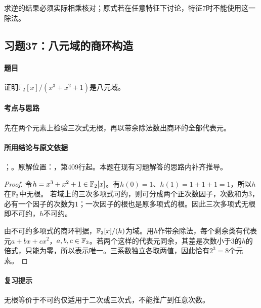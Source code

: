 求逆的结果必须实际相乘核对；原式若在任意特征下讨论，特征$7$时不能使用这一除法。



\subsection{习题37：八元域的商环构造}

\label{ex:3:37}

\paragraph{题目}

证明$\mathbb F_2[x]/(x^3+x^2+1)$是八元域。

\paragraph{考点与思路}

先在两个元素上检验三次式无根，再以带余除法数出商环的全部代表元。

\paragraph{所用结论与原文依据}

；。原解位置：，第409行起。本题在现有习题解答的思路内补齐推导。


\begin{proof}

令$h=x^3+x^2+1\in\mathbb F_2[x]$。有$h(0)=1$、$h(1)=1+1+1=1$，所以$h$在$\mathbb F_2$中无根。
若域上的三次多项式可约，则可分成两个正次数因子，次数和为$3$，必有一个因子的次数为$1$；一次因子的根也是原多项式的根。因此三次多项式无根即不可约，$h$不可约。

由不可约多项式的商环判据，$\mathbb F_2[x]/(h)$为域。用$h$作带余除法，每个剩余类有代表元$a+bx+cx^2$，$a,b,c\in\mathbb F_2$。若两个这样的代表元同余，其差是次数小于$3$的$h$的倍式，只能为零，所以表示唯一。三系数独立各取两值，因此恰有$2^3=8$个元素。

\end{proof}

\paragraph{复习提示}

无根等价于不可约仅适用于二次或三次式，不能推广到任意次数。



